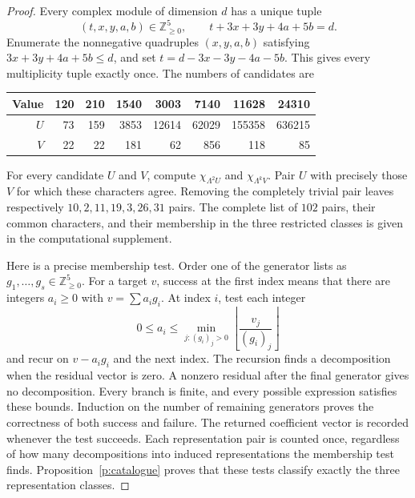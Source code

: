 \documentclass[11pt,a4paper]{article}
\begin{document}
\begin{proof}
Every complex module of dimension $d$ has a unique tuple
\[
(t,x,y,a,b)\in\mathbb Z_{\geq0}^5,\qquad t+3x+3y+4a+5b=d.
\]
Enumerate the nonnegative quadruples $(x,y,a,b)$ satisfying $3x+3y+4a+5b\leq d$, and set $t=d-3x-3y-4a-5b$. This gives every multiplicity tuple exactly once. The numbers of candidates are
\begin{center}\small
\begin{tabular}{r|rrrrrrr}
Value&120&210&1540&3003&7140&11628&24310\\\hline
$U$&73&159&3853&12614&62029&155358&636215\\
$V$&22&22&181&62&856&118&85
\end{tabular}\end{center}

For every candidate $U$ and $V$, compute $\chi_{\Lambda^2U}$ and $\chi_{\Lambda^kV}$. Pair $U$ with precisely those $V$ for which these characters agree. Removing the completely trivial pair leaves respectively $10,2,11,19,3,26,31$ pairs. The complete list of $102$ pairs, their common characters, and their membership in the three restricted classes is given in the computational supplement.

Here is a precise membership test. Order one of the generator lists as $g_1,\ldots,g_s\in\mathbb Z_{\geq0}^5$. For a target $v$, success at the first index means that there are integers $a_i\geq0$ with $v=\sum a_i g_i$. At index $i$, test each integer
\[
0\leq a_i\leq\min_{j:(g_i)_j>0}
                     \left\lfloor\frac{v_j}{(g_i)_j}\right\rfloor
\]
and recur on $v-a_i g_i$ and the next index. The recursion finds a decomposition when the residual vector is zero. A nonzero residual after the final generator gives no decomposition. Every branch is finite, and every possible expression satisfies these bounds. Induction on the number of remaining generators proves the correctness of both success and failure. The returned coefficient vector is recorded whenever the test succeeds. Each representation pair is counted once, regardless of how many decompositions into induced representations the membership test finds. Proposition~\ref{p:catalogue} proves that these tests classify exactly the three representation classes.


\end{proof}
\end{document}
